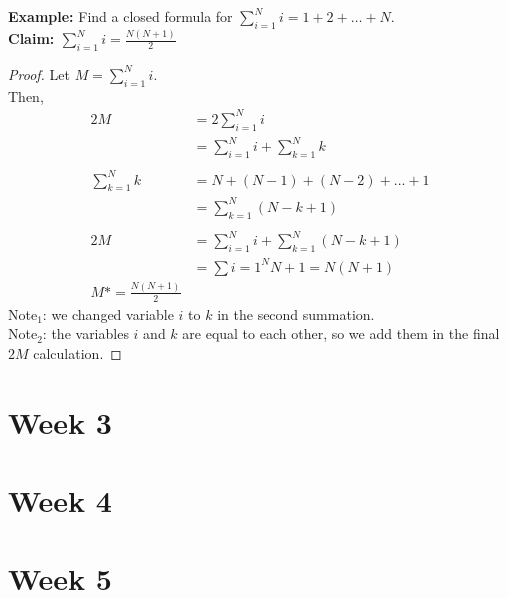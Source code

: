 \documentclass[12pt]{article}
\theoremstyle{definition}
\begin{document}
    \textbf{Example:} Find a closed formula for $\sum_{i=1}^{N}i=1+2+\dots+N$.\\
    \textbf{Claim: $\sum_{i=1}^{N}i = \frac{N(N+1)}{2}$}
    \begin{proof}
        Let $M = \sum_{i=1}^{N}i$. \\
        Then,
        \begin{align*}
            2M &= 2 \sum_{i=1}^{N}i \\
            &= \sum_{i=1}^{N}i + \sum_{k=1}^{N}k \\\\
            \sum_{k=1}^{N}k &= N + (N-1) + (N-2) + \dots + 1 \\
            &= \sum_{k=1}^{N} (N - k + 1) \\\\
            2M &= \sum_{i=1}^{N} i + \sum_{k=1}^{N} (N - k + 1) \\
            &= \sum{i=1}^{N} N + 1 = N(N+1) \\
            M *= \frac{N(N+1)}{2}
        \end{align*}
        Note$_{1}$: we changed variable $i$ to $k$ in the second summation. \\
        Note$_{2}$: the variables $i$ and $k$ are equal to each other, so we add
        them in the final $2M$ calculation.
    \end{proof}
    


    \newpage
    \section{Week 3}

    \newpage
    \section{Week 4}

    \newpage
    \section{Week 5}
    
\end{document}
